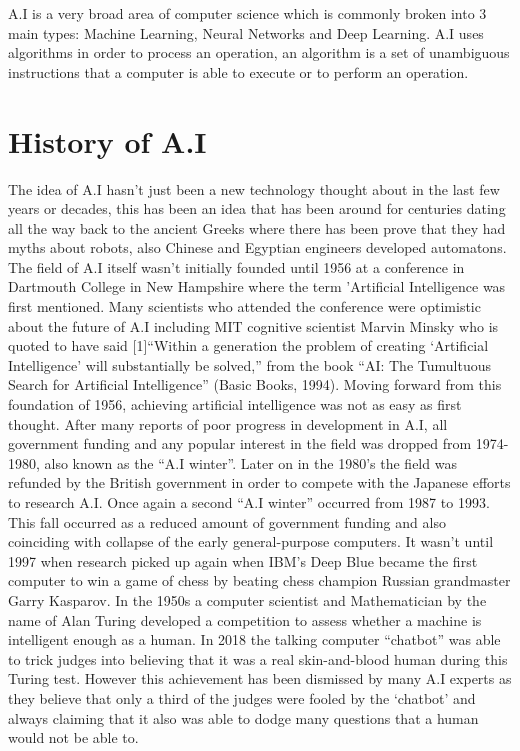 \documentclass[letterpaper, 10 pt, conference]{ieeeconf}  %
\begin{document}
A.I is a very broad area of computer science which is commonly broken into 3 main types: Machine Learning, Neural Networks and Deep Learning. A.I uses algorithms in order to process an operation, an algorithm is a set of unambiguous instructions that a computer is able to execute or to perform an operation.

\section{History of A.I}
The idea of A.I hasn't just been a new technology thought about in the last few years or decades, this has been an idea that has been around for centuries dating all the way back to the ancient Greeks where there has been prove that they had myths about robots, also Chinese and Egyptian engineers developed automatons. The field of A.I itself wasn't initially founded until 1956 at a conference in Dartmouth College in New Hampshire where the term 'Artificial Intelligence was first mentioned. Many scientists who attended the conference were optimistic about the future of A.I including MIT cognitive scientist Marvin Minsky who is quoted to have said [1]“Within a generation the problem of creating ‘Artificial Intelligence’ will substantially be solved,” from the book “AI: The Tumultuous Search for Artificial Intelligence” (Basic Books, 1994). Moving forward from this foundation of 1956, achieving artificial intelligence was not as easy as first thought. After many reports of poor progress in development in A.I, all government funding and any popular interest in the field was dropped from 1974-1980, also known as the “A.I winter”. Later on in the 1980’s the field was refunded by the British government in order to compete with the Japanese efforts to research A.I. Once again a second “A.I winter” occurred from 1987 to 1993. This fall occurred as a reduced amount of government funding and also coinciding with collapse of the early general-purpose computers. 
It wasn’t until 1997 when research picked up again when IBM’s Deep Blue became the first computer to win a game of chess by beating chess champion Russian grandmaster Garry Kasparov. In the 1950s a computer scientist and Mathematician by the name of Alan Turing developed a competition to assess whether a machine is intelligent enough as a human. In 2018 the talking computer “chatbot” was able to trick judges into believing that it was a real skin-and-blood human during this Turing test. However this achievement has been dismissed by many A.I experts as they believe that only a third of the judges were fooled by the ‘chatbot’ and always claiming that it also was able to dodge many questions that a human would not be able to. 
\end{document}
